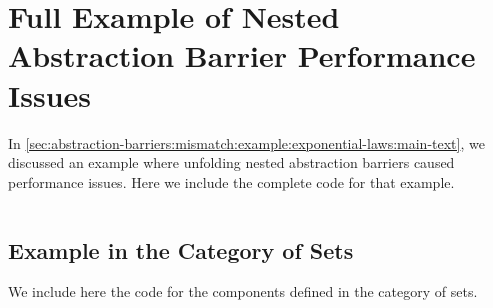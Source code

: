 \section{Full Example of Nested Abstraction Barrier Performance Issues}\label{sec:abstraction-barriers:mismatch:example:exponential-laws:full-code}

In \autoref{sec:abstraction-barriers:mismatch:example:exponential-laws:main-text}, we discussed an example where unfolding nested abstraction barriers caused performance issues.
Here we include the complete code for that example.


\inputminted{coq}{fragments/CategoryExponentialLaws.v}


\subsection{Example in the Category of Sets}\label{sec:abstraction-barriers:mismatch:example:exponential-laws:full-code:sets}

We include here the code for the components defined in the category of sets.

\inputminted{coq}{fragments/CategoryExponentialLawsSet.v}
